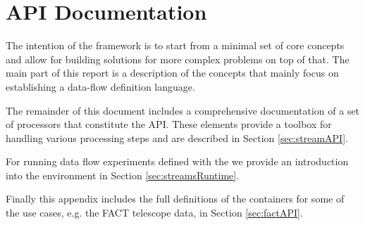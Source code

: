 \clearpage
\part{API Documentation}

The intention of the \streams framework is to start from a minimal set
of core concepts and allow for building solutions for more complex
problems on top of that. The main part of this report is a description
of the concepts that mainly focus on establishing a data-flow
definition language.

The remainder of this document includes a comprehensive documentation
of a set of processors that constitute the \streams API. These
elements provide a toolbox for handling various processing steps and
are described in Section \ref{sec:streamAPI}.

\bigskip

For running data flow experiments defined with the \streams we provide
an introduction into the  environment in Section
\ref{sec:streamsRuntime}.

\bigskip

Finally this appendix includes the full definitions of the containers
for some of the use cases, e.g. the FACT telescope data, in Section
\ref{sec:factAPI}.

\begin{appendix}



\end{appendix}